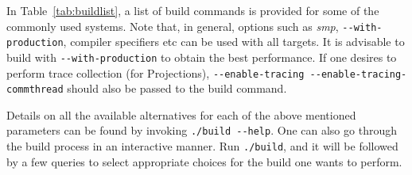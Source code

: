 In Table~\ref{tab:buildlist}, a list of build commands is provided for some of the commonly
used systems. Note that, in general, options such as {\em smp},
\verb|--with-production|, compiler specifiers etc can be used with all targets.
It is advisable to build with \verb|--with-production| to obtain the best
performance.  If one desires to perform trace collection (for Projections),
\verb|--enable-tracing --enable-tracing-commthread| should also be passed to the
build command.

Details on all the available alternatives for each of the above mentioned
parameters can be found by invoking \verb|./build --help|. One can also go through the
build process in an interactive manner. Run \verb|./build|, and it will be followed by
a few queries to select appropriate choices for the build one wants to perform.


